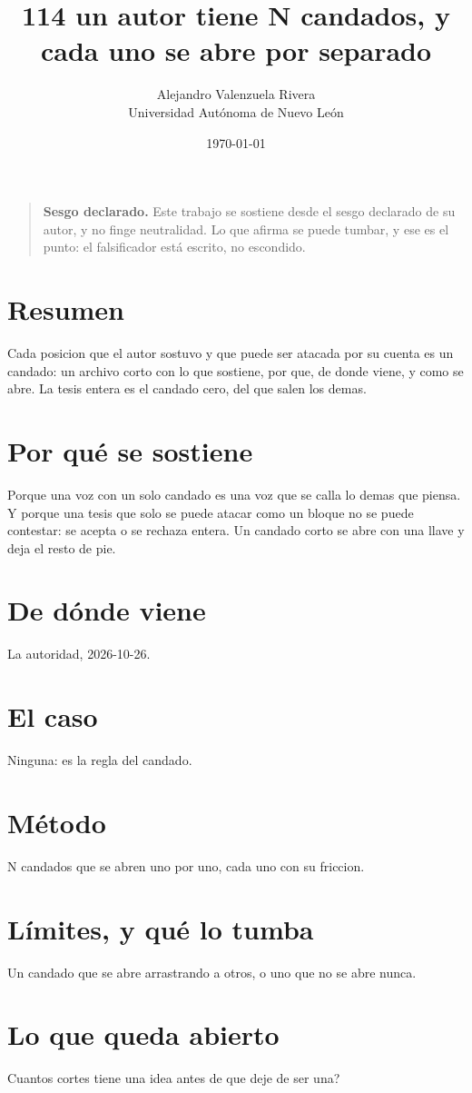 \documentclass[11pt,a4paper]{article}
\title{114 un autor tiene N candados, y cada uno se abre por separado}
\author{Alejandro Valenzuela Rivera\\\small Universidad Autónoma de Nuevo León}
\date{\today}
\begin{document}
\maketitle

\begin{quote}
\textbf{Sesgo declarado.} Este trabajo se sostiene desde el sesgo declarado de su autor, y no finge neutralidad. Lo que afirma se puede tumbar, y ese es el punto: el falsificador está escrito, no escondido.
\end{quote}

\section*{Resumen}
Cada posicion que el autor sostuvo y que puede ser atacada por su cuenta es un candado: un archivo corto con lo que sostiene, por que, de donde viene, y como se abre. La tesis entera es el candado cero, del que salen los demas.

\section{Por qué se sostiene}
Porque una voz con un solo candado es una voz que se calla lo demas que piensa. Y porque una tesis que solo se puede atacar como un bloque no se puede contestar: se acepta o se rechaza entera. Un candado corto se abre con una llave y deja el resto de pie.

\section{De dónde viene}
La autoridad, 2026-10-26.

\section{El caso}
Ninguna: es la regla del candado.

\section{Método}
N candados que se abren uno por uno, cada uno con su friccion.

\section{Límites, y qué lo tumba}
Un candado que se abre arrastrando a otros, o uno que no se abre nunca.

\section{Lo que queda abierto}
\textquestiondown{}Cuantos cortes tiene una idea antes de que deje de ser una?
\end{document}
